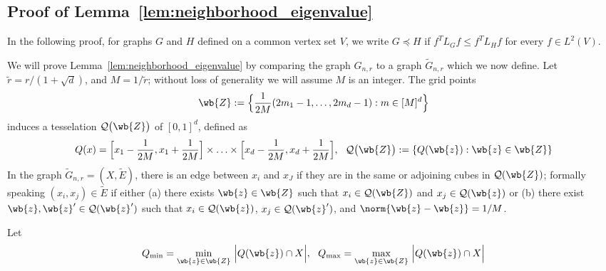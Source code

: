 \documentclass{article}
\newcommand{\set}[1]{\left\{#1\right\}}
\newcommand{\1}{\mathbf{1}}
\newcommand{\wt}[1]{\widetilde{#1}}
\theoremstyle{alden}
\theoremstyle{aldenthm}
\theoremstyle{definition}
\theoremstyle{remark}
\begin{document}
\subsection{Proof of Lemma~\ref{lem:neighborhood_eigenvalue}}
In the following proof, for graphs $G$ and $H$ defined on a common vertex set $V$, we write $G \preceq H$ if $f^T L_G f \leq f^T L_H f$ for every $f \in L^2(V)$.

We will prove Lemma~\ref{lem:neighborhood_eigenvalue} by comparing the graph $G_{n,r}$ to a graph $\wt{G}_{n,r}$ which we now define. Let $\wt{r} = r/(1 + \sqrt{d})$, and $M = 1/\wt{r}$; without loss of generality we will assume $M$ is an integer. The grid points
\begin{equation*}
\wb{Z} := \Bigl\{ \frac{1}{2M}(2m_1 - 1,\ldots,2m_d - 1): m \in [M]^d \Bigr\}
\end{equation*}
induces a tesselation $\mathcal{Q}\bigl(\wb{Z}\bigr)$ of $[0,1]^d$, defined as 
\begin{equation*}
Q(x) = \Bigl[x_1 - \frac{1}{2M}, x_1 + \frac{1}{2M}\Bigr] \times  \ldots \times \Bigl[x_d - \frac{1}{2M}, x_d + \frac{1}{2M}\Bigr],~~ \mathcal{Q}\bigl(\wb{Z}\bigr) := \set{Q(\wb{z}): \wb{z} \in \wb{Z}}
\end{equation*}
In the graph $\wt{G}_{n,r} = (X,\wt{E})$, there is an edge between $x_i$ and $x_J$ if they are in the same or adjoining cubes in $\mathcal{Q}(\wb{Z})$; formally speaking $(x_i,x_j) \in \wt{E}$ if either (a) there exists $\wb{z} \in \wb{Z}$ such that $x_i \in \mathcal{Q}(\wb{Z})$ and $x_j \in \mathcal{Q}(\wb{z})$ or (b) there exist $\wb{z}, \wb{z}' \in \mathcal{Q}(\wb{z}')$ such that $x_i \in \mathcal{Q}(\wb{z})$, $x_j \in \mathcal{Q}(\wb{z}')$, and $\norm{\wb{z} - \wb{z}} = 1/M$. 


Let 
\begin{equation*}
Q_{\min} = \min_{\wb{z} \in \wb{Z}}~ \Bigl|Q(\wb{z}) \cap X\Bigr|,~~ Q_{\max} = \max_{\wb{z} \in \wb{Z}}~ \Bigl|Q(\wb{z}) \cap X\Bigr|
\end{equation*}
\end{document}
